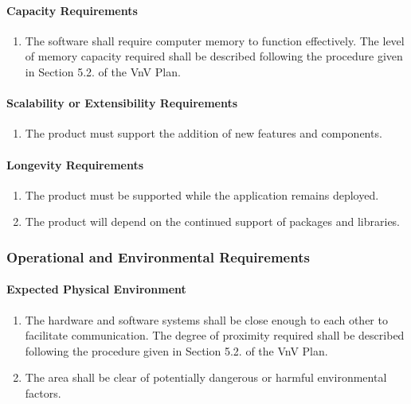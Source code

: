 \documentclass[12pt]{article}
\begin{document}
{\paragraph{Capacity Requirements}
\begin{enumerate}[{PR}1., leftmargin=2\parindent, resume]
    \item The software shall require computer memory to function effectively. The level of memory capacity required shall be described following
    the procedure given in Section 5.2.\thevnvSectionNfr{} of the VnV Plan.
\end{enumerate}

\paragraph{Scalability or Extensibility Requirements}
\begin{enumerate}[{PR}1., leftmargin=2\parindent, resume]
    \item The product must support the addition of new features and components.
\end{enumerate}

\paragraph{Longevity Requirements}
\begin{enumerate}[{PR}1., leftmargin=2\parindent, resume]
    \item The product must be supported while the application remains deployed.
    \item The product will depend on the continued support of packages and libraries.
\end{enumerate}



\subsubsection{Operational and Environmental Requirements}
\label{NFR_OE}
\paragraph{Expected Physical Environment}
\begin{enumerate}[{OE}1., leftmargin=2\parindent]
    \item The hardware and software systems shall be close enough to each other to facilitate communication. The degree of proximity required 
    shall be described following the procedure given in Section 5.2.\thevnvSectionNfr{} of the VnV Plan.
    \item The area shall be clear of potentially dangerous or harmful environmental factors.
\end{enumerate}

}
\end{document}
